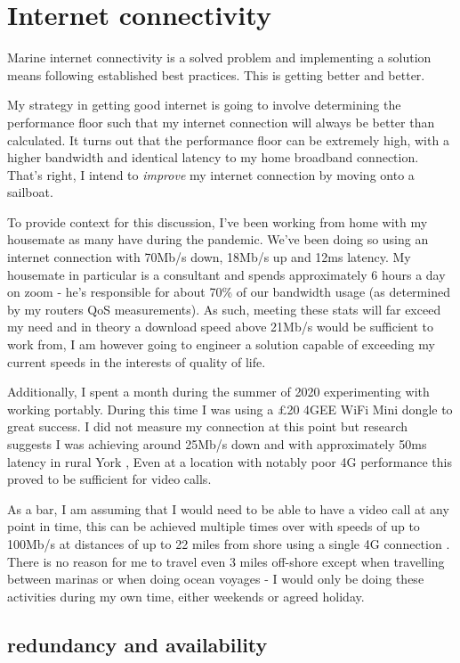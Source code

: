 \section{Internet connectivity}

Marine internet connectivity is a solved problem and implementing a solution means following established best practices. This is getting better and better.

My strategy in getting good internet is going to involve determining the performance floor such that my internet connection will always be better than calculated. It turns out that the performance floor can be extremely high, with a higher bandwidth and identical latency to my home broadband connection. That's right, I intend to \textit{improve} my internet connection by moving onto a sailboat.

To provide context for this discussion, I've been working from home with my housemate as many have during the pandemic. We've been doing so using an internet connection with 70Mb/s down, 18Mb/s up and 12ms latency. My housemate in particular is a consultant and spends approximately 6 hours a day on zoom - he's responsible for about 70\% of our bandwidth usage (as determined by my routers QoS measurements). As such, meeting these stats will far exceed my need and in theory a download speed above 21Mb/s would be sufficient to work from, I am however going to engineer a solution capable of exceeding my current speeds in the interests of quality of life.

Additionally, I spent a month during the summer of 2020 experimenting with working portably. During this time I was using a £20 4GEE WiFi Mini dongle to great success. I did not measure my connection at this point but research suggests I was achieving around 25Mb/s down and with approximately 50ms latency in rural York \cite{york-wifi}, Even at a location with notably poor 4G performance \cite{poor-york-4g}  this proved to be sufficient for video calls.

As a bar, I am assuming that I would need to be able to have a video call at any point in time, this can be achieved multiple times over with speeds of up to 100Mb/s at distances of up to 22 miles from shore using a single 4G connection \cite{coastal-marine-wifi}. There is no reason for me to travel even 3 miles off-shore except when travelling  between marinas or when doing ocean voyages - I would only be doing these activities during my own time, either weekends or agreed holiday.

\subsection{redundancy and availability}

